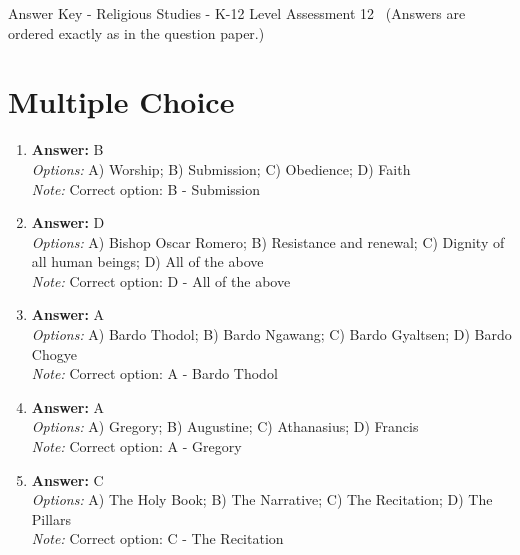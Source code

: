 \documentclass[12pt]{article}
\begin{document}
\begin{center}
Answer Key - Religious Studies - K-12 Level Assessment 12 \
\small (Answers are ordered exactly as in the question paper.)
\end{center}

\section*{Multiple Choice}
\begin{enumerate}[label=\arabic*.]
\item \textbf{Answer:} B
\\ \textit{Options:} A) Worship; B) Submission; C) Obedience; D) Faith
\\ \textit{Note:} Correct option: B - Submission
\item \textbf{Answer:} D
\\ \textit{Options:} A) Bishop Oscar Romero; B) Resistance and renewal; C) Dignity of all human beings; D) All of the above
\\ \textit{Note:} Correct option: D - All of the above
\item \textbf{Answer:} A
\\ \textit{Options:} A) Bardo Thodol; B) Bardo Ngawang; C) Bardo Gyaltsen; D) Bardo Chogye
\\ \textit{Note:} Correct option: A - Bardo Thodol
\item \textbf{Answer:} A
\\ \textit{Options:} A) Gregory; B) Augustine; C) Athanasius; D) Francis
\\ \textit{Note:} Correct option: A - Gregory
\item \textbf{Answer:} C
\\ \textit{Options:} A) The Holy Book; B) The Narrative; C) The Recitation; D) The Pillars
\\ \textit{Note:} Correct option: C - The Recitation
\end{enumerate}
\end{document}
